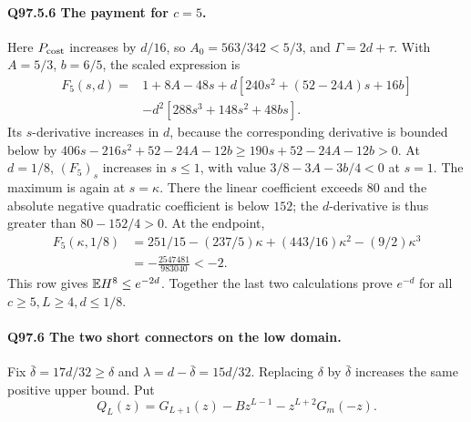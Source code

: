 \paragraph{Q97.5.6 The payment for \(c=\allowbreak 5\).}
Here \(P_{\rm cost}\) increases by \(d/16\), so
\(A_0=\allowbreak 563/342<\allowbreak 5/3\), and \(\Gamma=\allowbreak 2d+\tau\).
With \(A=\allowbreak 5/3\), \(b=\allowbreak 6/5\), the scaled expression is
\begin{equation}\tag{Q97.5.7}\label{eq:Q97:5.7}
\begin{aligned}
F_5(s,d)={}&1+8A-48s+d[240s^2+(52-24A)s+16b]\\
&-d^2[288s^3+148s^2+48bs].
\end{aligned}
\end{equation}
Its \(s\)-derivative increases in \(d\), because the corresponding
derivative is bounded below by
\(406s-216s^2+52-24A-12b\ge\allowbreak 190s+52-24A-12b>\allowbreak 0\).
At \(d=\allowbreak 1/8\), \((F_5)_s\) increases in \(s\le\allowbreak 1\), with value
\(3/8-3A-3b/4<\allowbreak 0\) at \(s=\allowbreak 1\). The maximum is again at \(s=\allowbreak \kappa\).
There the linear coefficient exceeds \(80\) and the absolute negative
quadratic coefficient is below \(152\); the \(d\)-derivative is thus
greater than \(80-152/4>\allowbreak 0\). At the endpoint,
\begin{equation}\tag{Q97.5.8}\label{eq:Q97:5.8}
\begin{aligned}
F_5(\kappa,1/8)&=251/15-(237/5)\kappa+(443/16)\kappa^2-(9/2)\kappa^3\\
&=-\frac{2547481}{983040}<-2.
\end{aligned}
\end{equation}
This row gives \(\mathbb E H^8\le\allowbreak  e^{-2d}\). Together the last two
calculations prove \(e^{-d}\) for all \(c\ge\allowbreak 5,\allowbreak L\ge\allowbreak 4,\allowbreak d\le\allowbreak 1/8\).

\paragraph{Q97.6 The two short connectors on the low domain.}
Fix \(\bar\delta=\allowbreak 17d/32\ge\allowbreak \delta\) and
\(\lambda=\allowbreak d-\bar\delta=\allowbreak 15d/32\). Replacing \(\delta\) by
\(\bar\delta\) increases the same positive upper bound. Put
\begin{equation}\tag{Q97.6.1}\label{eq:Q97:6.1}
Q_L(z)=G_{L+1}(z)-Bz^{L-1}-z^{L+2}G_m(-z).
\end{equation}

